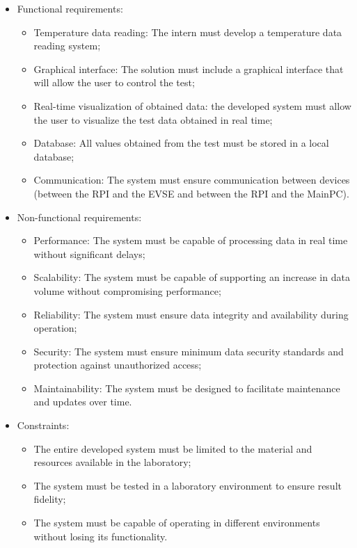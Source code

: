\begin{itemize}
    \item[] Functional requirements:
        \begin{itemize}
            \item Temperature data reading: The intern must develop a temperature data reading system; 
            \item Graphical interface: The solution must include a graphical interface that will allow the user to control the test;
            \item Real-time visualization of obtained data: the developed system must allow the user to visualize the test data obtained in real time;
            \item Database: All values obtained from the test must be stored in a local database;
            \item Communication: The system must ensure communication between devices (between the RPI and the EVSE and between the RPI and the MainPC).
        \end{itemize}
    \item[] Non-functional requirements:
        \begin{itemize}
            \item Performance: The system must be capable of processing data in real time without significant delays;
            \item Scalability: The system must be capable of supporting an increase in data volume without compromising performance;
            \item Reliability: The system must ensure data integrity and availability during operation;
            \item Security: The system must ensure minimum data security standards and protection against unauthorized access;
            \item Maintainability: The system must be designed to facilitate maintenance and updates over time.
        \end{itemize}
    \item[] Constraints:
        \begin{itemize}
            \item The entire developed system must be limited to the material and resources available in the laboratory;
            \item The system must be tested in a laboratory environment to ensure result fidelity;
            \item The system must be capable of operating in different environments without losing its functionality.
        \end{itemize}
\end{itemize}

